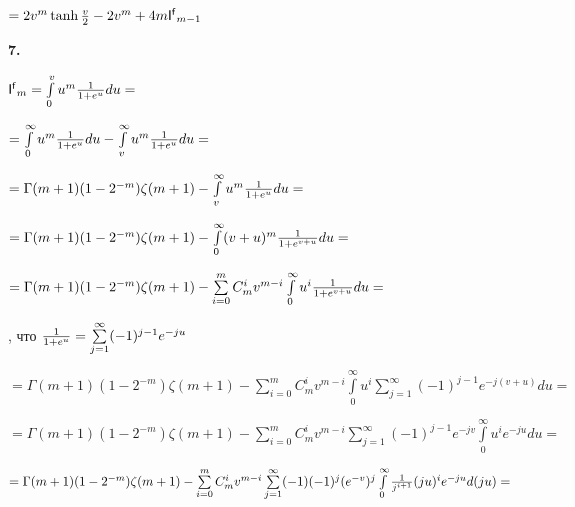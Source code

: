 \documentclass[a4paper,12pt]{article}
\begin{document}
\begin{center}
    $= 2v^m \operatorname{tanh}{v\over{2}} - 2v^m + 4m \mathsf{I^f}_{m - 1}$
\end{center}

\noindent\textbf{7.}

\begin{center}
    $\mathsf{I^f}_m = \int\limits_0^v u^{m} {1\over{1 + e^{u}}}d u =$
\end{center}

\begin{center}
    $= \int\limits_0^{\infty} u^{m} {1\over{1 + e^{u}}}d u - \int\limits_v^{\infty} u^{m} {1\over{1 + e^{u}}}d u =$
\end{center}

\begin{center}
    $= \Gamma(m + 1)(1 - 2^{- m})\zeta(m + 1) - \int\limits_v^{\infty} u^{m} {1\over{1 + e^{u}}}d u = $
\end{center}

\begin{center}
    $= \Gamma(m + 1)(1 - 2^{- m})\zeta(m + 1) - \int\limits_0^{\infty} (v + u)^{m} {1\over{1 + e^{v + u}}}d u = $
\end{center}

\begin{center}
    $= \Gamma(m + 1)(1 - 2^{- m})\zeta(m + 1) - \sum\limits_{i = 0}^m C_m^i v^{m - i} \int\limits_0^{\infty} u^{i} {1\over{1 + e^{v + u}}}d u = $
\end{center}

, что ${1\over{1 + e^{u}}} = \sum\limits_{j = 1}^{\infty} (-1)^{j - 1}e^{-j u}$

\begin{center}
    $= \Gamma(m + 1)(1 - 2^{- m})\zeta(m + 1) - \sum\limits_{i = 0}^m C_m^i v^{m - i} \int\limits_0^{\infty} u^{i} \sum\limits_{j = 1}^{\infty} (-1)^{j - 1}e^{-j(v + u)}d u = $
\end{center}

\begin{center}
    $= \Gamma(m + 1)(1 - 2^{- m})\zeta(m + 1) - \sum\limits_{i = 0}^m C_m^i v^{m - i} \sum\limits_{j = 1}^{\infty} (-1)^{j - 1}e^{-j v}\int\limits_0^{\infty} u^{i} e^{-j u}d u = $
\end{center}

\begin{center}
    $= \Gamma(m + 1)(1 - 2^{- m})\zeta(m + 1) - \sum\limits_{i = 0}^m C_m^i v^{m - i} \sum\limits_{j = 1}^{\infty} (-1) (-1)^{j} (e^{-v})^j\int\limits_0^{\infty}{1\over{j^{i + 1}}} (j u)^{i} e^{-j u}d (j u) = $
\end{center}
\end{document}

